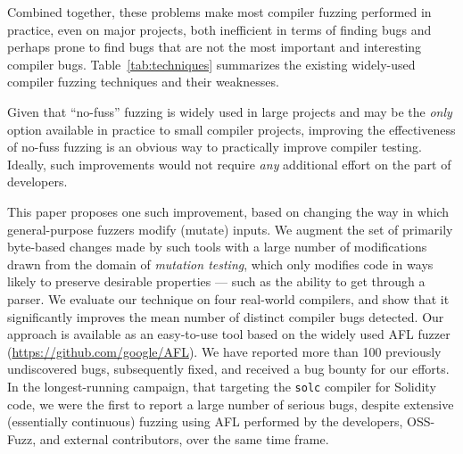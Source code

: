   Combined together, these problems make most compiler fuzzing
  performed in practice, even on major projects, both inefficient in
  terms of finding bugs and perhaps prone to find bugs that are not
  the most important and interesting compiler bugs.
  Table~\ref{tab:techniques} summarizes the existing widely-used
  compiler fuzzing techniques and their weaknesses.

  Given that ``no-fuss'' fuzzing is widely used in large projects and
  may be the \emph{only} option available in
  practice to small compiler projects, improving the effectiveness of no-fuss fuzzing is an obvious way to practically improve compiler
  testing.  Ideally, such improvements would not require \emph{any}
  additional effort on the part of developers.

  This paper proposes one such improvement, based on changing the way
  in which general-purpose fuzzers modify (mutate) inputs.  We augment
  the set of primarily byte-based changes made by such tools with a large number of
  modifications drawn from the domain of \emph{mutation testing},
  which only modifies code in ways likely to preserve desirable
  properties --- such as the ability to get through a parser.  We evaluate
  our technique on four real-world compilers, and show that it
  significantly improves the mean number of distinct compiler bugs
  detected.  Our approach is available as an easy-to-use tool
  based on the widely used AFL fuzzer
  (\url{https://github.com/google/AFL}). We have reported more than
  100 previously undiscovered 
  bugs, subsequently fixed, and received a bug bounty for
  our efforts.  In the longest-running campaign, that targeting the
  {\tt solc} compiler for Solidity code, we were the first to
  report a large number of serious bugs, despite extensive
  (essentially continuous)
  fuzzing using AFL performed by the developers, OSS-Fuzz,
  and external contributors, over the same time frame.